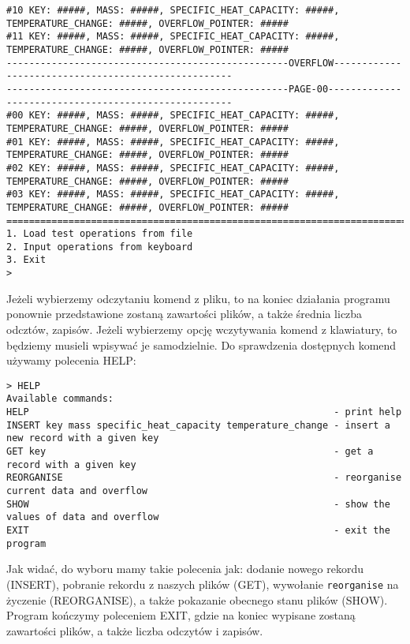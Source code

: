 \documentclass{article}
\begin{document}
\begin{lstlisting}[basicstyle=\ttfamily\fontsize{6}{8}\selectfont, breaklines=true]
#10 KEY: #####, MASS: #####, SPECIFIC_HEAT_CAPACITY: #####, TEMPERATURE_CHANGE: #####, OVERFLOW_POINTER: #####
#11 KEY: #####, MASS: #####, SPECIFIC_HEAT_CAPACITY: #####, TEMPERATURE_CHANGE: #####, OVERFLOW_POINTER: #####
--------------------------------------------------OVERFLOW----------------------------------------------------
--------------------------------------------------PAGE-00-----------------------------------------------------
#00 KEY: #####, MASS: #####, SPECIFIC_HEAT_CAPACITY: #####, TEMPERATURE_CHANGE: #####, OVERFLOW_POINTER: #####
#01 KEY: #####, MASS: #####, SPECIFIC_HEAT_CAPACITY: #####, TEMPERATURE_CHANGE: #####, OVERFLOW_POINTER: #####
#02 KEY: #####, MASS: #####, SPECIFIC_HEAT_CAPACITY: #####, TEMPERATURE_CHANGE: #####, OVERFLOW_POINTER: #####
#03 KEY: #####, MASS: #####, SPECIFIC_HEAT_CAPACITY: #####, TEMPERATURE_CHANGE: #####, OVERFLOW_POINTER: #####
==============================================================================================================
1. Load test operations from file
2. Input operations from keyboard
3. Exit
> 
    \end{lstlisting}

    Jeżeli wybierzemy odczytaniu komend z pliku, to na koniec działania programu ponownie przedstawione zostaną zawartości plików, a także średnia liczba odcztów, zapisów.
    Jeżeli wybierzemy opcję wczytywania komend z klawiatury, to będziemy musieli wpisywać je samodzielnie. Do sprawdzenia dostępnych komend używamy polecenia HELP:

    \begin{lstlisting}[basicstyle=\ttfamily\fontsize{6}{8}\selectfont, breaklines=true]
> HELP
Available commands:
HELP                                                      - print help
INSERT key mass specific_heat_capacity temperature_change - insert a new record with a given key
GET key                                                   - get a record with a given key
REORGANISE                                                - reorganise current data and overflow
SHOW                                                      - show the values of data and overflow
EXIT                                                      - exit the program
    \end{lstlisting}

    Jak widać, do wyboru mamy takie polecenia jak: dodanie nowego rekordu (INSERT), pobranie rekordu z naszych plików (GET), wywołanie \texttt{reorganise} na życzenie (REORGANISE), a także pokazanie obecnego stanu plików (SHOW).
    Program kończymy poleceniem EXIT, gdzie na koniec wypisane zostaną zawartości plików, a także liczba odczytów i zapisów.
\end{document}
